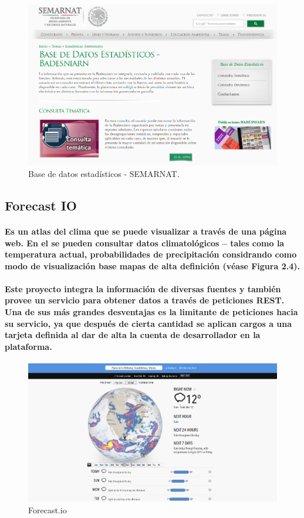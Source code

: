     \begin{figure}[h!]
        \centering
          \includegraphics[width=\textwidth]{./images/BADESNIARN.png}
        \caption{Base de datos estadísticos - SEMARNAT.}
    \end{figure}

  \subsection {Forecast IO}
    \paragraph {Es un atlas del clima que se puede visualizar a través de una página web. En el se pueden consultar datos climatológicos – tales como la temperatura actual, probabilidades de precipitación considrando como modo de visualización base mapas de alta definición (véase Figura 2.4).}

    \paragraph{Este proyecto integra la información de diversas fuentes y también provee un servicio para obtener datos a través de peticiones REST. Una de sus más grandes desventajas es la limitante de peticiones hacia su servicio, ya que después de cierta cantidad se aplican cargos a una tarjeta definida al dar de alta la cuenta de desarrollador en la plataforma. \cite{14}}

    \begin{figure}[h!]
        \centering
          \includegraphics[width=\textwidth]{./images/ForecastIO.png}
        \caption{Forecast.io}
    \end{figure}    

